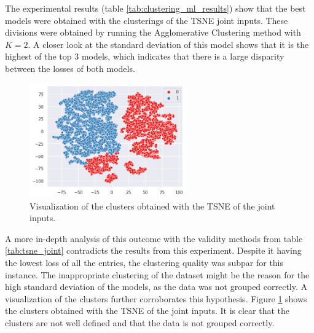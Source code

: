 The experimental results (table \ref{tab:clustering_ml_results}) show that the best models were obtained with the clusterings of the TSNE joint inputs. These divisions were obtained by running the Agglomerative Clustering method with $K=2$. A closer look at the standard deviation of this model shows that it is the highest of the top 3 models, which indicates that there is a large disparity between the losses of both models. 

\begin{figure}
    \caption{Visualization of the clusters obtained with the TSNE of the joint inputs.}
    \label{fig:tsne_joint_kmeans_2}
    \centering
    \includegraphics[width=0.6\textwidth]{figures/tsne_joint_kmeans_2.png}
\end{figure}

A more in-depth analysis of this outcome with the validity methods from table \ref{tab:tsne_joint} contradicts the results from this experiment. Despite it having the lowest loss of all the entries, the clustering quality was subpar for this instance. The inappropriate clustering of the dataset might be the reason for the high standard deviation of the models, as the data was not grouped correctly. A visualization of the clusters further corroborates this hypothesis. Figure \ref{fig:tsne_joint_kmeans_2} shows the clusters obtained with the TSNE of the joint inputs. It is clear that the clusters are not well defined and that the data is not grouped correctly. 

